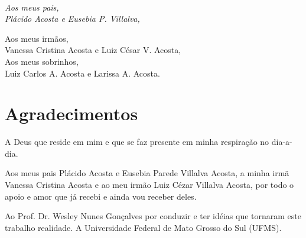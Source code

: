 \ \\
\vspace{80ex}

\begin{flushright}
\it
  Aos meus pais,\\
  Plácido Acosta e Eusebia P. Villalva,\\

\vspace{3ex}

  Aos meus irmãos,\\
  Vanessa Cristina Acosta e Luiz César V. Acosta,\\

\vspace{3ex}
  Aos meus sobrinhos,\\
  Luiz Carlos A. Acosta e Larissa A. Acosta.
\end{flushright}



\cleardoublepage
\chapter*{Agradecimentos}

		A Deus que reside em mim e que se faz presente em minha respiração no dia-a-dia.
		
		Aos meus pais Plácido Acosta e Eusebia Parede Villalva Acosta, a minha irmã Vanessa Cristina Acosta e ao meu irmão Luiz Cézar Villalva Acosta, por todo o apoio e amor que já recebi e ainda vou receber deles.

		Ao Prof. Dr. Wesley Nunes Gonçalves por conduzir e ter idéias que tornaram este trabalho realidade.
		A Universidade Federal de Mato Grosso do Sul (UFMS).
		



